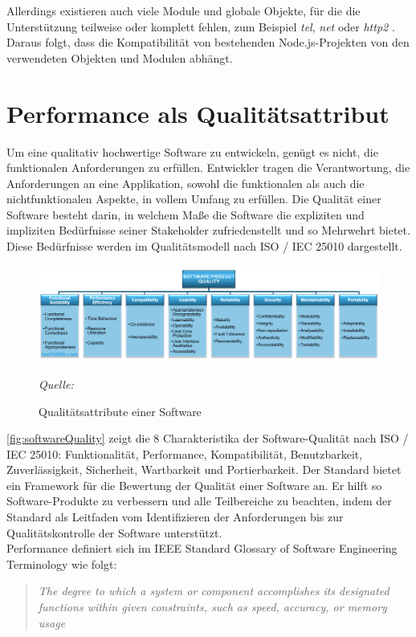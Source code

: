 \noindent
Allerdings existieren auch viele Module und globale Objekte, für die die Unterstützung teilweise oder komplett fehlen, zum Beispiel \textit{tel}, \textit{net} oder \textit{http2} \cite{OvenSh.2023c}. Daraus folgt, dass die Kompatibilität von bestehenden Node.js-Projekten von den verwendeten Objekten und Modulen abhängt.

\section{Performance als Qualitätsattribut} \label{sec:foundations-Performance}
Um eine qualitativ hochwertige Software zu entwickeln, genügt es nicht, die funktionalen Anforderungen zu erfüllen. Entwickler tragen die Verantwortung, die Anforderungen an eine Applikation, sowohl die funktionalen als auch die nichtfunktionalen Aspekte, in vollem Umfang zu erfüllen. Die Qualität einer Software besteht darin, in welchem Maße die Software die expliziten und impliziten Bedürfnisse seiner Stakeholder zufriedenstellt und so Mehrwehrt bietet. Diese Bedürfnisse werden im Qualitätsmodell nach ISO / IEC 25010 dargestellt.\cite{.2022}\\

\begin{figure}[h]
	\centering
	\includegraphics[width=\linewidth]{./images/iso25010.png}
	\caption{Qualitätsattribute einer Software}
	\label{fig:softwareQuality}
	\textit{Quelle: \cite{.2022}}
\end{figure}

\noindent
\autoref{fig:softwareQuality} zeigt die 8 Charakteristika der Software-Qualität nach ISO / IEC 25010: Funktionalität, Performance, Kompatibilität, Benutzbarkeit, Zuverlässigkeit, Sicherheit, Wartbarkeit und Portierbarkeit. Der Standard bietet ein Framework für die Bewertung der Qualität einer Software an. Er hilft so Software-Produkte zu verbessern und alle Teilbereiche zu beachten, indem der Standard als Leitfaden vom Identifizieren der Anforderungen bis zur Qualitätskontrolle der Software unterstützt.\cite{ISOIEC.}\\

\noindent
Performance definiert sich im IEEE Standard Glossary of Software Engineering Terminology wie folgt:
\begin{quote}
	\emph{\grqq{}The degree to which a system or component accomplishes its designated functions within given constraints, such as speed, accuracy, or memory usage\grqq{}} \cite{IEEE.}
\end{quote}

